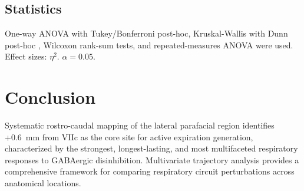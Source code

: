 \documentclass[11pt]{article}
\begin{document}
\subsection{Statistics}
One-way ANOVA with Tukey/Bonferroni post-hoc, Kruskal-Wallis with Dunn post-hoc \citep{kruskal1952nonparametric, dunn1964multiple}, Wilcoxon rank-sum tests, and repeated-measures ANOVA were used. Effect sizes: $\eta^2$. $\alpha = 0.05$.

\section{Conclusion}

Systematic rostro-caudal mapping of the lateral parafacial region identifies +0.6~mm from VIIc as the core site for active expiration generation, characterized by the strongest, longest-lasting, and most multifaceted respiratory responses to GABAergic disinhibition. Multivariate trajectory analysis provides a comprehensive framework for comparing respiratory circuit perturbations across anatomical locations.



\end{document}
